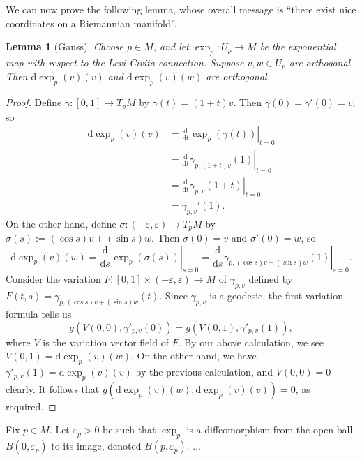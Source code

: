 \documentclass{book}
\renewcommand{\d}{\mathrm{d}}
\renewcommand{\epsilon}{\varepsilon}
\newcommand{\odv}[3][]{\frac{\d^{#1}#2}{\d{#3}^{#1}}}
\newtheorem{lemma}[theorem]{Lemma}
\theoremstyle{definition}
\numberwithin{equation}{section}
\begin{document}
We can now prove the following lemma, whose overall message is ``there exist nice coordinates on a Riemannian manifold''.
\begin{lemma}[Gauss]
    Choose $p \in M$, and let $\exp_p \colon U_p \to M$ be the exponential map with respect to the Levi-Civita connection. Suppose $v,w \in U_p$ are orthogonal. Then $\d\exp_p(v)(v)$ and $\d\exp_p(v)(w)$ are orthogonal.
\end{lemma}
\begin{proof}
    Define $\gamma \colon [0,1] \to T_p M$ by $\gamma(t) = (1+t)v$. Then $\gamma(0) = \gamma'(0) = v$, so 
    \begin{equation} \begin{aligned}
        \d\exp_p(v)(v) &= \left. \odv{}{t} \exp_p(\gamma(t)) \right\vert_{t=0} \\
                       &= \left. \odv{}{t} \gamma_{p,(1+t)v}(1) \right\vert_{t=0} \\
                       &= \left. \odv{}{t} \gamma_{p,v}(1+t) \right\vert_{t=0} \\
                       &= \gamma_{p,v}'(1).
    \end{aligned} \end{equation}
    On the other hand, define $\sigma \colon (-\epsilon,\epsilon) \to T_p M$ by $\sigma(s) := (\cos{s})v + (\sin{s})w$. Then $\sigma(0) = v$ and $\sigma'(0) = w$, so 
    \begin{equation} 
        \d\exp_p(v)(w) = \left. \odv{}{s} \exp_p(\sigma(s)) \right\vert_{s=0} 
                       = \left. \odv{}{s} \gamma_{p,(\cos{s})v + (\sin{s})w}(1) \right\vert_{s=0}.
    \end{equation}
    Consider the variation $F \colon [0,1] \times (-\epsilon,\epsilon) \to M$ of $\gamma_{p,v}$ defined by $F(t,s) = \gamma_{p,(\cos{s})v + (\sin{s})w}(t)$. Since $\gamma_{p,v}$ is a geodesic, the first variation formula tells us
    \begin{equation}
        g(V(0,0),\gamma'_{p,v}(0)) = g(V(0,1),\gamma'_{p,v}(1)),
    \end{equation}
    where $V$ is the variation vector field of $F$. By our above calculation, we see $V(0,1) = \d\exp_p(v)(w)$. On the other hand, we have $\gamma'_{p,v}(1) = \d\exp_p(v)(v)$ by the previous calculation, and $V(0,0) = 0$ clearly. It follows that $g(\d\exp_p(v)(w),\d\exp_p(v)(v)) = 0$, as required.
\end{proof}

Fix $p \in M$. Let $\epsilon_p > 0$ be such that $\exp_p$ is a diffeomorphism from the open ball $B(0,\epsilon_p)$ to its image, denoted $B(p,\epsilon_p)$. ...
\end{document}
